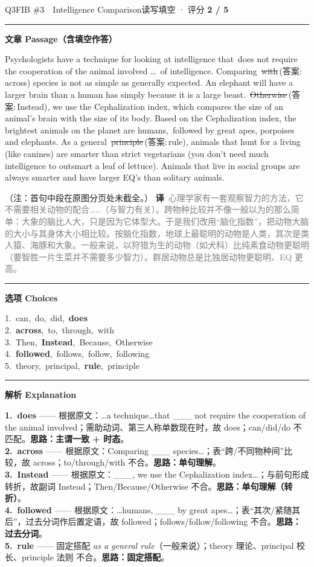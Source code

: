 \documentclass[11pt]{article}
\newcommand{\ptesub}[1]{%
  \par\needspace{2\baselineskip}\smallskip
  {\color{cAccent}\rule[-0.2ex]{3pt}{1.05em}}\hspace{6pt}%
  {\bfseries\color{cHead}#1}\par\nopagebreak\smallskip}
\newcommand{\zh}[1]{{\footnotesize\textcolor{cNote}{\textbf{译}}\ \textcolor{gray}{#1}}}
\newcommand{\rok}[1]{{\color{cFix}\ding{51}\,#1}}                 %
\newcommand{\rno}[2]{{\color{cWrong}\ding{55}\,\sout{#1}}\,{\footnotesize\color{cFix}(答案:\,#2)}}  %
\begin{document}
\begin{qblock}{Q3\quad FIB \#3\ \ Intelligence Comparison}{读写填空 · 评分 \textcolor{cAccent}{\bfseries 2 / 5}}
\ptesub{文章 Passage（含填空作答）}
\begin{promptbox}
Psychologists have a technique for looking at intelligence that \rok{does} not require the cooperation of the animal involved \dots\ of intelligence. Comparing \rno{with}{across} species is not as simple as generally expected. An elephant will have a larger brain than a human has simply because it is a large beast. \rno{Otherwise}{Instead}, we use the Cephalization index, which compares the size of an animal's brain with the size of its body. Based on the Cephalization index, the brightest animals on the planet are humans, \rok{followed} by great apes, porpoises and elephants. As a general \rno{principle}{rule}, animals that hunt for a living (like canines) are smarter than strict vegetarians (you don't need much intelligence to outsmart a leaf of lettuce). Animals that live in social groups are always smarter and have larger EQ's than solitary animals.
\end{promptbox}
{\footnotesize\color{gray}（注：首句中段在原图分页处未截全。）}
\zh{心理学家有一套观察智力的方法，它不需要相关动物的配合……（与智力有关）。跨物种比较并不像一般以为的那么简单：大象的脑比人大，只是因为它体型大。于是我们改用“脑化指数”，把动物大脑的大小与其身体大小相比较。按脑化指数，地球上最聪明的动物是人类，其次是类人猿、海豚和大象。一般来说，以狩猎为生的动物（如犬科）比纯素食动物更聪明（要智胜一片生菜并不需要多少智力）。群居动物总是比独居动物更聪明、EQ 更高。}
\ptesub{选项 Choices}
{\small
1.\ can,\ do,\ did,\ \textbf{does}\\
2.\ \textbf{across},\ to,\ through,\ with\\
3.\ Then,\ \textbf{Instead},\ Because,\ Otherwise\\
4.\ \textbf{followed},\ follows,\ follow,\ following\\
5.\ theory,\ principal,\ \textbf{rule},\ principle}
\ptesub{解析 Explanation}
\begin{notebox}\footnotesize
\textbf{1.\ does} —— 根据原文：…a technique…that \_\_\_ not require the cooperation of the animal involved；需助动词、第三人称单数现在时，故 does；can/did/do 不匹配。\textbf{思路：主谓一致 + 时态}。\\[2pt]
\textbf{2.\ across} —— 根据原文：Comparing \_\_\_ species…；表“跨/不同物种间”比较，故 across；to/through/with 不合。\textbf{思路：单句理解}。\\[2pt]
\textbf{3.\ Instead} —— 根据原文：\_\_\_, we use the Cephalization index…；与前句形成转折，故副词 Instead；Then/Because/Otherwise 不合。\textbf{思路：单句理解（转折）}。\\[2pt]
\textbf{4.\ followed} —— 根据原文：…humans, \_\_\_ by great apes…；表“其次/紧随其后”，过去分词作后置定语，故 followed；follows/follow/following 不合。\textbf{思路：过去分词}。\\[2pt]
\textbf{5.\ rule} —— 固定搭配 \emph{as a general rule}（一般来说）；theory 理论、principal 校长、principle 法则 不合。\textbf{思路：固定搭配}。
\end{notebox}
\end{qblock}
\end{document}
